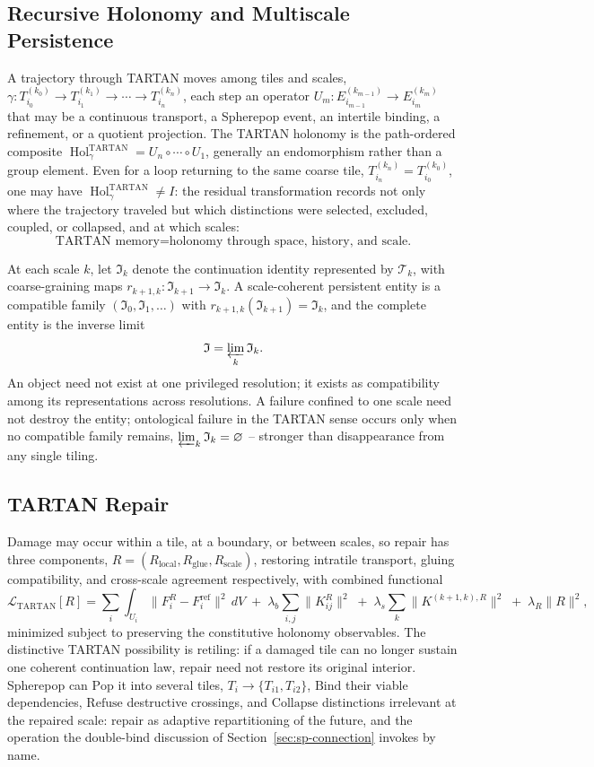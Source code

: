 \documentclass[11pt]{article}
\newcommand{\Hol}{\operatorname{Hol}}
\newcommand{\Pop}{\mathrm{Pop}}
\newcommand{\Refuse}{\mathrm{Refuse}}
\newcommand{\Bind}{\mathrm{Bind}}
\newcommand{\Collapse}{\mathrm{Collapse}}
\begin{document}
\subsection{Recursive Holonomy and Multiscale Persistence}

A trajectory through TARTAN moves among tiles and scales, $\gamma : T_{i_0}^{(k_0)} \to T_{i_1}^{(k_1)} \to \cdots \to T_{i_n}^{(k_n)}$, each step an operator $U_m : E_{i_{m-1}}^{(k_{m-1})} \to E_{i_m}^{(k_m)}$ that may be a continuous transport, a Spherepop event, an intertile binding, a refinement, or a quotient projection. The TARTAN holonomy is the path-ordered composite $\Hol_\gamma^{\mathrm{TARTAN}} = U_n \circ \cdots \circ U_1$, generally an endomorphism rather than a group element. Even for a loop returning to the same coarse tile, $T_{i_n}^{(k_n)} = T_{i_0}^{(k_0)}$, one may have $\Hol_\gamma^{\mathrm{TARTAN}} \neq I$: the residual transformation records not only where the trajectory traveled but which distinctions were selected, excluded, coupled, or collapsed, and at which scales:
\[
\text{TARTAN memory} = \text{holonomy through space, history, and scale.}
\]

At each scale $k$, let $\mathfrak{I}_k$ denote the continuation identity represented by $\mathcal{T}_k$, with coarse-graining maps $r_{k+1,k} : \mathfrak{I}_{k+1} \to \mathfrak{I}_k$. A scale-coherent persistent entity is a compatible family $(\mathfrak{I}_0, \mathfrak{I}_1, \ldots)$ with $r_{k+1,k}(\mathfrak{I}_{k+1}) = \mathfrak{I}_k$, and the complete entity is the inverse limit
\[
\mathfrak{I} = \varprojlim_k \mathfrak{I}_k.
\]
An object need not exist at one privileged resolution; it exists as compatibility among its representations across resolutions. A failure confined to one scale need not destroy the entity; ontological failure in the TARTAN sense occurs only when no compatible family remains, $\varprojlim_k \mathfrak{I}_k = \varnothing$ -- stronger than disappearance from any single tiling.

\subsection{TARTAN Repair}

Damage may occur within a tile, at a boundary, or between scales, so repair has three components, $R = (R_{\mathrm{local}}, R_{\mathrm{glue}}, R_{\mathrm{scale}})$, restoring intratile transport, gluing compatibility, and cross-scale agreement respectively, with combined functional
\[
\mathcal{L}_{\mathrm{TARTAN}}[R] = \sum_i \int_{U_i} \|F_i^R - F_i^{\mathrm{ref}}\|^2\, dV \;+\; \lambda_b \sum_{i,j} \|K_{ij}^R\|^2 \;+\; \lambda_s \sum_k \|K^{(k+1,k),R}\|^2 \;+\; \lambda_R \|R\|^2,
\]
minimized subject to preserving the constitutive holonomy observables. The distinctive TARTAN possibility is retiling: if a damaged tile can no longer sustain one coherent continuation law, repair need not restore its original interior. Spherepop can $\Pop$ it into several tiles, $T_i \to \{T_{i1}, T_{i2}\}$, $\Bind$ their viable dependencies, $\Refuse$ destructive crossings, and $\Collapse$ distinctions irrelevant at the repaired scale: repair as adaptive repartitioning of the future, and the operation the double-bind discussion of Section~\ref{sec:sp-connection} invokes by name.
\end{document}
